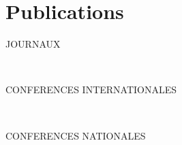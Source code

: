 \chapter*{Publications}


\begin{refsection}[ownpubs]

    \noindent JOURNAUX
    \small
    \nocite{soulej2025jaamas}

    \printbibliography[keyword=journal, heading=none]

    \

    \noindent CONFERENCES INTERNATIONALES
    \small
    \nocite{soule2024moise_marl}
    \nocite{soule2024marl}
    \nocite{soulej2023sim}
    \nocite{soulej2025cloud}
    \printbibliography[keyword=international, heading=none]

    \

    \noindent CONFERENCES NATIONALES
    \nocite{soule2023jfsmathese}
    \nocite{soule2023ressithese}
    \nocite{soule2023rjciathese}
    \nocite{soule2024outil}
    \nocite{soule2024approche}
    \nocite{soule2025jfsma}
    \printbibliography[keyword=national, heading=none]

\end{refsection}
